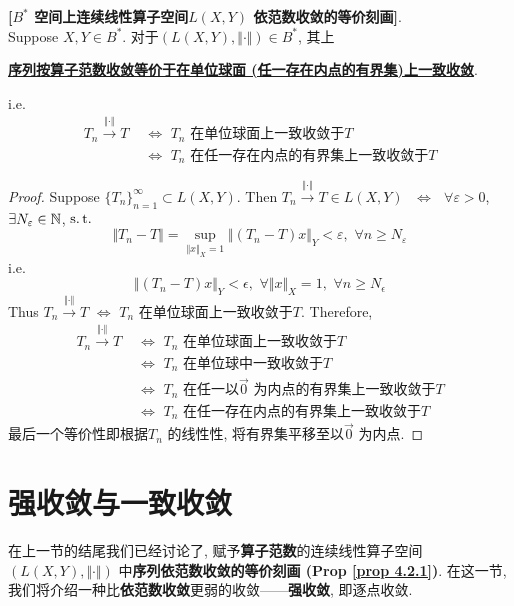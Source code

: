 	\begin{proposition}\label{prop 4.2.1}
		\textbf{[$B^*$ 空间上连续线性算子空间$L(X , Y)$ 依范数收敛的等价刻画]}. \\
		Suppose $X , Y \in B^*$. 对于$(L(X , Y) , \Vert \cdot \Vert) \in B^*$, 其上
		\begin{center}
			\underline{\textbf{序列按算子范数收敛等价于在单位球面 (任一存在内点的有界集)上一致收敛}}.
		\end{center}
		i.e. 
		\begin{align*}
			T_n \overset{\Vert \cdot \Vert}{\to} T \,\, &\Leftrightarrow \,\, T_n \,\, \text{在单位球面上一致收敛于$T$} \\
			&\Leftrightarrow \,\, T_n \,\, \text{在任一存在内点的有界集上一致收敛于$T$}
		\end{align*}
		
		\vspace*{4em}
		
		\begin{proof}
			Suppose $\{ T_n \}_{n = 1}^{\infty} \subset L(X , Y)$. Then $T_{n} \overset{\Vert \cdot \Vert}{\to} T \in L(X , Y)$ $\,\, \Leftrightarrow \,\, $ $\forall \varepsilon > 0$, $\exists N_\varepsilon \in \mathbb{N}$, $\operatorname{s.t.}$
			\[ \Vert T_n - T \Vert = \sup_{\Vert x \Vert_X = 1} \Vert (T_n - T)x \Vert_Y < \varepsilon , \,\, \forall n \geq N_\varepsilon \]
			i.e. 
			\[ \Vert (T_n - T)x \Vert_Y < \epsilon , \,\, \forall \Vert x \Vert_X = 1 , \,\, \forall n \geq N_\epsilon \]
			Thus $T_n \overset{\Vert \cdot \Vert}{\to} T \,\, \Leftrightarrow \,\, T_n$ 在单位球面上一致收敛于$T$. Therefore, 
			\begin{align*}
				T_n \overset{\Vert \cdot \Vert}{\to} T \,\, &\Leftrightarrow \,\, T_n \,\, \text{在单位球面上一致收敛于$T$} \\
				&\Leftrightarrow \,\, T_n \,\, \text{在单位球中一致收敛于$T$} \\
				&\Leftrightarrow \,\, T_n \,\, \text{在任一以$\overrightarrow{0}$ 为内点的有界集上一致收敛于$T$} \\
				&\Leftrightarrow \,\, T_n \,\, \text{在任一存在内点的有界集上一致收敛于$T$} 
			\end{align*}
			最后一个等价性即根据$T_n$ 的线性性, 将有界集平移至以$\overrightarrow{0}$ 为内点. 
		\end{proof}
	\end{proposition}

\newpage

\section{强收敛与一致收敛}
	在上一节的结尾我们已经讨论了, 赋予\textbf{算子范数}的连续线性算子空间$(L(X , Y) , \Vert \cdot \Vert)$ 中\textbf{序列依范数收敛的等价刻画 (Prop \ref{prop 4.2.1})}. 在这一节, 我们将介绍一种比\textbf{依范数收敛}更弱的收敛——\textbf{强收敛}, 即逐点收敛. 
	
